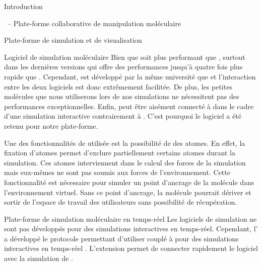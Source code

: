 \documentclass[myfrancais]{mythesis}
\begin{document}
\begin{mypart}{Introduction}
\begin{mychapter}{\myShaddock\ -- Plate-forme collaborative de manipulation moléculaire}
\begin{mysection}{Plate-forme de simulation et de visualisation}
\begin{mysubsection}{Logiciel de simulation moléculaire}
					Bien que \myGromacs soit plus performant que , surtout dans les dernières versions  qui offre des performances jusqu'à quatre fois plus rapide que .
					Cependant,  est développé par la même université que  et l'interaction entre les deux logiciels est donc extrêmement facilitée.
					De plus, les petites molécules que nous utiliserons lors de nos simulations ne nécessitent pas des performances exceptionnelles.
					Enfin,  peut être aisément connecté à  dans le cadre d'une simulation interactive  contrairement à \myGromacs.
					C'est pourquoi le logiciel  a été retenu pour notre plate-forme.

					Une des fonctionnalités de  utilisée est la possibilité de  des atomes.
					En effet, la fixation d'atomes permet d'exclure partiellement certains atomes durant la simulation.
					Ces atomes interviennent dans le calcul des forces de la simulation mais eux-mêmes ne sont pas soumis aux forces de l'environnement.
					Cette fonctionnalité est nécessaire pour simuler un point d'ancrage de la molécule dans l'environnement virtuel.
					Sans ce point d'ancrage, la molécule pourrait dériver et sortir de l'espace de travail des utilisateurs sans possibilité de récupération.
				\end{mysubsection}
				\begin{mysubsection}{Plate-forme de simulation moléculaire en temps-réel}
					Les logiciels de simulation ne sont pas développés pour des simulations interactives en temps-réel.
					Cependant, l' a développé le protocole  permettant d'utiliser  couplé à  pour des simulations interactives en temps-réel .
					L'extension  permet de connecter rapidement le logiciel  avec la simulation de .


\end{mysubsection}
\end{mysection}
\end{mychapter}
\end{mypart}
\end{document}
